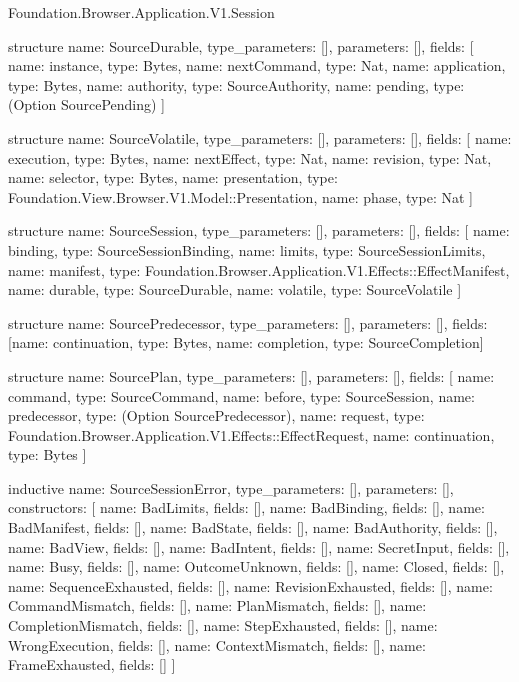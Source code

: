 \begin{lexlean}{Foundation.Browser.Application.V1.Session}
\begin{semanticmodule}
structure{
  name: SourceDurable,
  type_parameters: [],
  parameters: [],
  fields: [
    {name: instance, type: Bytes},
    {name: nextCommand, type: Nat},
    {name: application, type: Bytes},
    {name: authority, type: SourceAuthority},
    {name: pending, type: (Option SourcePending)}
  ]
}

structure{
  name: SourceVolatile,
  type_parameters: [],
  parameters: [],
  fields: [
    {name: execution, type: Bytes},
    {name: nextEffect, type: Nat},
    {name: revision, type: Nat},
    {name: selector, type: Bytes},
    {name: presentation, type: Foundation.View.Browser.V1.Model::Presentation},
    {name: phase, type: Nat}
  ]
}

structure{
  name: SourceSession,
  type_parameters: [],
  parameters: [],
  fields: [
    {name: binding, type: SourceSessionBinding},
    {name: limits, type: SourceSessionLimits},
    {name: manifest, type: Foundation.Browser.Application.V1.Effects::EffectManifest},
    {name: durable, type: SourceDurable},
    {name: volatile, type: SourceVolatile}
  ]
}

structure{
  name: SourcePredecessor,
  type_parameters: [],
  parameters: [],
  fields: [{name: continuation, type: Bytes}, {name: completion, type: SourceCompletion}]
}

structure{
  name: SourcePlan,
  type_parameters: [],
  parameters: [],
  fields: [
    {name: command, type: SourceCommand},
    {name: before, type: SourceSession},
    {name: predecessor, type: (Option SourcePredecessor)},
    {name: request, type: Foundation.Browser.Application.V1.Effects::EffectRequest},
    {name: continuation, type: Bytes}
  ]
}

inductive{
  name: SourceSessionError,
  type_parameters: [],
  parameters: [],
  constructors: [
    {name: BadLimits, fields: []},
    {name: BadBinding, fields: []},
    {name: BadManifest, fields: []},
    {name: BadState, fields: []},
    {name: BadAuthority, fields: []},
    {name: BadView, fields: []},
    {name: BadIntent, fields: []},
    {name: SecretInput, fields: []},
    {name: Busy, fields: []},
    {name: OutcomeUnknown, fields: []},
    {name: Closed, fields: []},
    {name: SequenceExhausted, fields: []},
    {name: RevisionExhausted, fields: []},
    {name: CommandMismatch, fields: []},
    {name: PlanMismatch, fields: []},
    {name: CompletionMismatch, fields: []},
    {name: StepExhausted, fields: []},
    {name: WrongExecution, fields: []},
    {name: ContextMismatch, fields: []},
    {name: FrameExhausted, fields: []}
  ]
}


\end{semanticmodule}
\end{lexlean}
